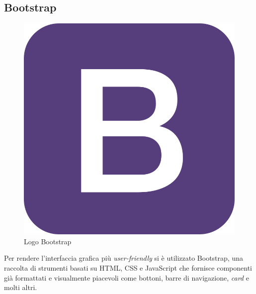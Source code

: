 \subsection{Bootstrap}

\begin{figure}
\begin{center}
\includegraphics[width=0.11\columnwidth]{images/bootstraplogo.png}
\end{center}
\caption{Logo Bootstrap}
\label{fig:bootstrap}
\end{figure}

Per rendere l'interfaccia grafica più \textit{user-friendly} si è utilizzato Bootstrap, una raccolta di strumenti basati su HTML, CSS e JavaScript che fornisce componenti già formattati e visualmente
piacevoli come bottoni, barre di navigazione, \textit{card} e molti altri.








